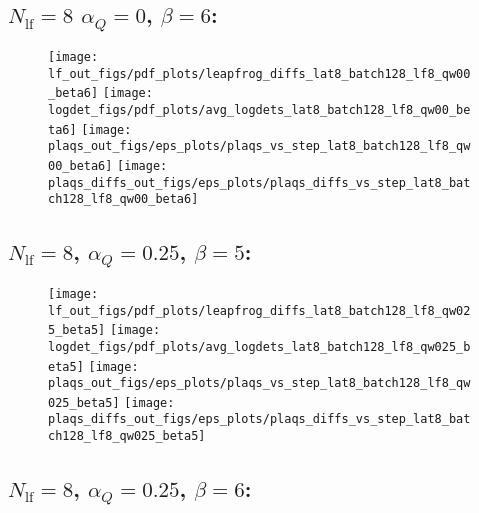 %
\clearpage
\subsection{\texorpdfstring{$N_{\mathrm{lf}} = 8$}{Nlf = 8} \texorpdfstring{$\alpha_Q = 0$}{alphaq = 0},
\texorpdfstring{$\beta = 6$}{beta = 6}:}
\begin{figure}[htpb]
  \texttt{[image: lf\_out\_figs/pdf\_plots/leapfrog\_diffs\_lat8\_batch128\_lf8\_qw00\_beta6]}
  \hfill
  \texttt{[image: logdet\_figs/pdf\_plots/avg\_logdets\_lat8\_batch128\_lf8\_qw00\_beta6]}
  \hfill
  \texttt{[image: plaqs\_out\_figs/eps\_plots/plaqs\_vs\_step\_lat8\_batch128\_lf8\_qw00\_beta6]}
  \hfill
  \texttt{[image: plaqs\_diffs\_out\_figs/eps\_plots/plaqs\_diffs\_vs\_step\_lat8\_batch128\_lf8\_qw00\_beta6]}
\end{figure}


\clearpage
\subsection{\texorpdfstring{$N_{\mathrm{lf}} = 8$}{Nlf = 8}, \texorpdfstring{$\alpha_Q = 0.25$}{alphaq = 0.25},
\texorpdfstring{$\beta = 5$}{beta = 5}:}
%
\begin{figure}[htpb]
  \centering
  \texttt{[image: lf\_out\_figs/pdf\_plots/leapfrog\_diffs\_lat8\_batch128\_lf8\_qw025\_beta5]}
  \hfill
  \texttt{[image: logdet\_figs/pdf\_plots/avg\_logdets\_lat8\_batch128\_lf8\_qw025\_beta5]}
  \hfill
  \texttt{[image: plaqs\_out\_figs/eps\_plots/plaqs\_vs\_step\_lat8\_batch128\_lf8\_qw025\_beta5]}
  \hfill
  \texttt{[image: plaqs\_diffs\_out\_figs/eps\_plots/plaqs\_diffs\_vs\_step\_lat8\_batch128\_lf8\_qw025\_beta5]}
\end{figure}

\clearpage
\subsection{\texorpdfstring{$N_{\mathrm{lf}} = 8$}{Nlf = 8}, \texorpdfstring{$\alpha_Q = 0.25$}{alphaq = 0.25},
\texorpdfstring{$\beta = 6$}{beta = 6}:}
%

